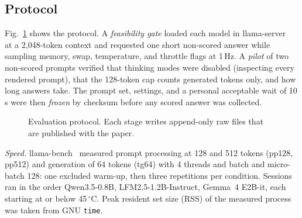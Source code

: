 \documentclass[conference]{IEEEtran}
\newcommand{\qwen}{Qwen3.5-0.8B}
\newcommand{\lfm}{LFM2.5-1.2B-Instruct}
\newcommand{\gemma}{Gemma~4 E2B-it}
\begin{document}
\subsection{Protocol}
Fig.~\ref{fig:pipeline} shows the protocol. A \emph{feasibility gate} loaded each model in llama-server~\cite{llamaserver} at a 2{,}048-token context and requested one short non-scored answer while sampling memory, swap, temperature, and throttle flags at 1\,Hz. A \emph{pilot} of two non-scored prompts verified that thinking modes were disabled (inspecting every rendered prompt), that the 128-token cap counts generated tokens only, and how long answers take. The prompt set, settings, and a personal acceptable wait of 10\,s were then \emph{frozen} by checksum before any scored answer was collected.

\begin{figure}[t]
\centering
{}
\caption{Evaluation protocol. Each stage writes append-only raw files that are published with the paper.}
\label{fig:pipeline}
\end{figure}

\emph{Speed.} llama-bench~\cite{llamabench} measured prompt processing at 128 and 512 tokens (pp128, pp512) and generation of 64 tokens (tg64) with 4 threads and batch and micro-batch 128: one excluded warm-up, then three repetitions per condition. Sessions ran in the order \qwen{}, \lfm{}, \gemma{}, each starting at or below 45\,$^\circ$C. Peak resident set size (RSS) of the measured process was taken from GNU \texttt{time}.
\end{document}
